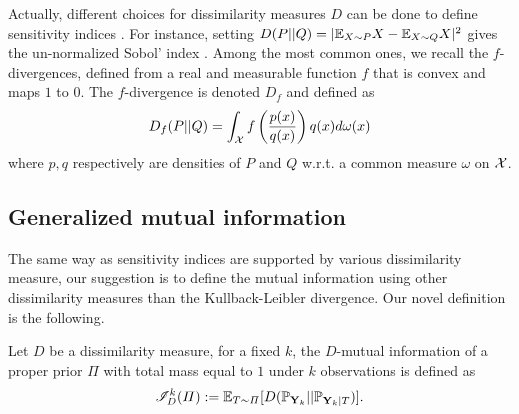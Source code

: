 Actually, different choices for dissimilarity measures $D$ can be done to define sensitivity indices \citep{da_veiga_global_2015}. For instance, setting $D(P||Q)=|\mathbb{E}_{X\sim P}X-\mathbb{E}_{X\sim Q}X|^2$ gives the un-normalized Sobol’ index \citep{sobol_sensitivity_1993}.
Among the most common ones, we recall the $f$-divergences, defined from a real and measurable function $f$ that is convex and maps $1$ to $0$. The $f$-divergence is denoted $D_f$ and defined as 
    \begin{equation}
        D_f(P||Q) = \int_{\mathcal{X}} f\left(\frac{p(x)}{q(x)}\right) q(x) d\omega(x)
    \end{equation}
where $p,q$ respectively are densities of $P$ and $Q$  w.r.t. a common measure $\omega$ on $\mathcal{X}$.







\subsection{Generalized mutual information}


The same way as sensitivity indices are supported by various dissimilarity measure, our suggestion is to define the mutual information using other dissimilarity measures than the Kullback-Leibler divergence.
Our novel definition is the following.
\begin{defi}
    Let $D$ be a dissimilarity measure, for a fixed $k$, the $D$-mutual information of a proper prior $\varPi$ with total mass equal to $1$ under $k$ observations is defined as
        \begin{equation}
            \mathscr{I}_D^k(\varPi) := \mathbb{E}_{T\sim\varPi}[D(\mathbb{P}_{\mathbf{Y}_k}||\mathbb{P}_{\mathbf{Y}_k|T} )].
        \end{equation}
\end{defi}

